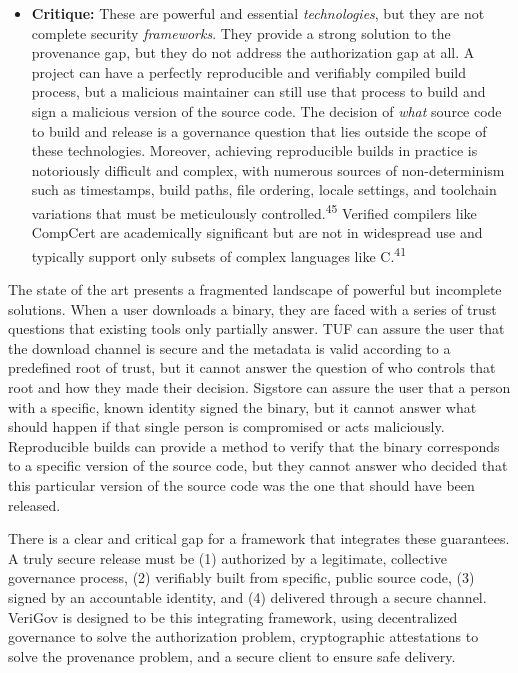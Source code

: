 \documentclass{article}
\begin{document}
\begin{itemize}
\item \textbf{Critique:} These are powerful and essential \emph{technologies}, but they are not complete security \emph{frameworks}. They provide a strong solution to the provenance gap, but they do not address the authorization gap at all. A project can have a perfectly reproducible and verifiably compiled build process, but a malicious maintainer can still use that process to build and sign a malicious version of the source code. The decision of \emph{what} source code to build and release is a governance question that lies outside the scope of these technologies. Moreover, achieving reproducible builds in practice is notoriously difficult and complex, with numerous sources of non-determinism such as timestamps, build paths, file ordering, locale settings, and toolchain variations that must be meticulously controlled.\textsuperscript{45} Verified compilers like CompCert are academically significant but are not in widespread use and typically support only subsets of complex languages like C.\textsuperscript{41}
\end{itemize}

The state of the art presents a fragmented landscape of powerful but incomplete solutions. When a user downloads a binary, they are faced with a series of trust questions that existing tools only partially answer. TUF can assure the user that the download channel is secure and the metadata is valid according to a predefined root of trust, but it cannot answer the question of who controls that root and how they made their decision. Sigstore can assure the user that a person with a specific, known identity signed the binary, but it cannot answer what should happen if that single person is compromised or acts maliciously. Reproducible builds can provide a method to verify that the binary corresponds to a specific version of the source code, but they cannot answer who decided that this particular version of the source code was the one that should have been released.

There is a clear and critical gap for a framework that integrates these guarantees. A truly secure release must be (1) authorized by a legitimate, collective governance process, (2) verifiably built from specific, public source code, (3) signed by an accountable identity, and (4) delivered through a secure channel. VeriGov is designed to be this integrating framework, using decentralized governance to solve the authorization problem, cryptographic attestations to solve the provenance problem, and a secure client to ensure safe delivery.
\end{document}
